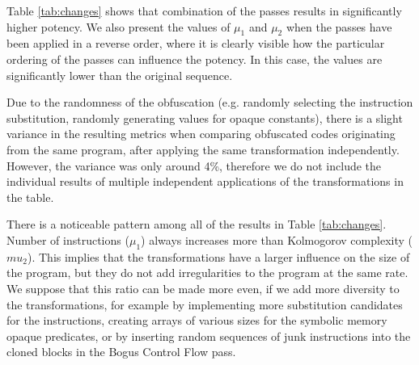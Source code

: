 \documentclass[
  digital, %
  notable,   %
  twoside, %
  nolof,     %
  nolot,     %
]{fithesis3}
\theoremstyle{definition}
\begin{document}
Table \ref{tab:changes} shows that combination of the passes results in significantly higher potency. We also present the values of $\mu_1$ and $\mu_2$ when the passes have been applied in a reverse order, where it is clearly visible how the particular ordering of the passes can influence the potency. In this case, the values are significantly lower than the original sequence. 

Due to the randomness of the obfuscation (e.g. randomly selecting the instruction substitution, randomly generating values for opaque constants), there is a slight variance in the resulting metrics when comparing obfuscated codes originating from the same program, after applying the same transformation independently. However, the variance was only around 4\%, therefore we do not include the individual results of multiple independent applications of the transformations in the table.

There is a noticeable pattern among all of the results in Table \ref{tab:changes}. Number of instructions ($\mu_1$) always increases more than Kolmogorov complexity ($mu_2$). This implies that the transformations have a larger influence on the size of the program, but they do not add irregularities to the program at the same rate. We suppose that this ratio can be made more even, if we add more diversity to the transformations, for example by implementing more substitution candidates for the instructions, creating arrays of various sizes for the symbolic memory opaque predicates, or by inserting random sequences of junk instructions into the cloned blocks in the Bogus Control Flow pass.
\end{document}
